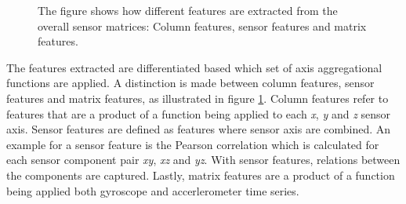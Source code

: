 \begin{figure}[h!]
\begin{minipage}{.3\textwidth}
  \end{minipage}
  \begin{minipage}{.3\textwidth}
    \centering
  \end{minipage}
  \caption{The figure shows how different features are extracted from the overall sensor matrices: Column features, sensor features and matrix features.}\label{fig:featureextraction}
\end{figure}  

The features extracted are differentiated based which set of axis aggregational functions are applied. A distinction is made between column features, sensor features and matrix features, as illustrated in figure \ref{fig:featureextraction}. Column features refer to features that are a product of a function being applied to each \textit{x}, \textit{y} and \textit{z} sensor axis. Sensor features are defined as features where sensor axis are combined. An example for a sensor feature is the Pearson correlation which is calculated for each sensor component pair \textit{xy}, \textit{xz} and \textit{yz}. With sensor features, relations between the components are captured. Lastly, matrix features are a product of a function being applied both gyroscope and accerlerometer time series.\\

